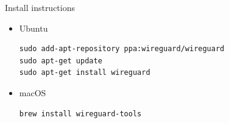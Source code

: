 \documentclass[xcolor=table]{beamer}
\begin{document}
    \begin{frame}[fragile]{Install instructions}
        \begin{itemize}
            \item Ubuntu
            \begin{verbatim}
sudo add-apt-repository ppa:wireguard/wireguard
sudo apt-get update
sudo apt-get install wireguard
            \end{verbatim}
            \item macOS
            \begin{verbatim}
brew install wireguard-tools
            \end{verbatim}
        \end{itemize}
    \end{frame}
\end{document}
